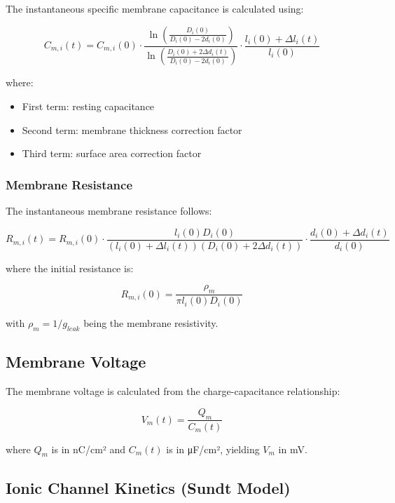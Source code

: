 \documentclass[11pt,a4paper]{article}
\begin{document}
The instantaneous specific membrane capacitance is calculated using:

\begin{equation}
C_{m,i}(t) = C_{m,i}(0) \cdot \frac{\ln\left(\frac{D_i(0)}{D_i(0)-2d_i(0)}\right)}{\ln\left(\frac{D_i(0)+2\Delta d_i(t)}{D_i(0)-2d_i(0)}\right)} \cdot \frac{l_i(0)+\Delta l_i(t)}{l_i(0)}
\end{equation}

where:
\begin{itemize}
    \item First term: resting capacitance
    \item Second term: membrane thickness correction factor
    \item Third term: surface area correction factor
\end{itemize}

\subsubsection{Membrane Resistance}

The instantaneous membrane resistance follows:

\begin{equation}
R_{m,i}(t) = R_{m,i}(0) \cdot \frac{l_i(0)D_i(0)}{(l_i(0)+\Delta l_i(t))(D_i(0)+2\Delta d_i(t))} \cdot \frac{d_i(0)+\Delta d_i(t)}{d_i(0)}
\end{equation}

where the initial resistance is:

\begin{equation}
R_{m,i}(0) = \frac{\rho_m}{\pi l_i(0) D_i(0)}
\end{equation}

with $\rho_m = 1/g_{leak}$ being the membrane resistivity.

\subsection{Membrane Voltage}

The membrane voltage is calculated from the charge-capacitance relationship:

\begin{equation}
V_m(t) = \frac{Q_m}{C_m(t)}
\end{equation}

where $Q_m$ is in nC/cm² and $C_m(t)$ is in μF/cm², yielding $V_m$ in mV.

\subsection{Ionic Channel Kinetics (Sundt Model)}
\end{document}
